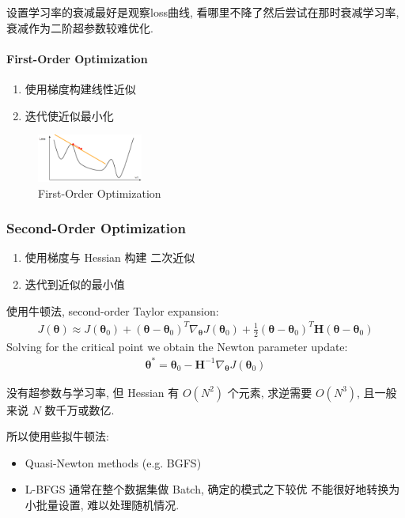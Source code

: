 设置学习率的衰减最好是观察loss曲线, 看哪里不降了然后尝试在那时衰减学习率, 衰减作为二阶超参数较难优化. 

\paragraph{First-Order Optimization}
\begin{enumerate}
    \item 使用梯度构建线性近似
    \item 迭代使近似最小化
\end{enumerate}

\begin{figure}[!htb]
    \centering
    \includegraphics[width=0.309\textwidth]{pic/Lec7/First-Order Optimization}
    \caption{First-Order Optimization}
\end{figure}

\subsubsection{Second-Order Optimization}
\begin{enumerate}
    \item 使用梯度与 Hessian 构建 二次近似
    \item 迭代到近似的最小值
\end{enumerate}

使用牛顿法, second-order Taylor expansion:
\begin{align*}
    J(\mathbf{\theta})\approx J(\mathbf{\theta}_0)+(\mathbf{\theta}-\mathbf{\theta}_0)^T\nabla_{\mathbf{\theta}}J(\mathbf{\theta}_0)+\frac{1}{2}(\mathbf{\theta}-\mathbf{\theta}_0)^T\mathbf{H}(\mathbf{\theta}-\mathbf{\theta}_0)
\end{align*}
Solving for the critical point we obtain the Newton parameter update:
\begin{align*}
    \mathbf{\theta}^*=\mathbf{\theta}_0-\mathbf{H}^{-1}\nabla_{\mathbf{\theta}}J(\mathbf{\theta}_0)
\end{align*}

没有超参数与学习率, 但 Hessian 有 $O(N^2)$ 个元素, 求逆需要 $O(N^3)$, 且一般来说 $N$ 数千万或数亿. 

所以使用些拟牛顿法:
\begin{itemize}
    \item Quasi-Newton methods (e.g. BGFS)
    \item L-BFGS 
    \subitem 通常在整个数据集做 Batch, 确定的模式之下较优
    \subitem 不能很好地转换为小批量设置, 难以处理随机情况. 
\end{itemize}

